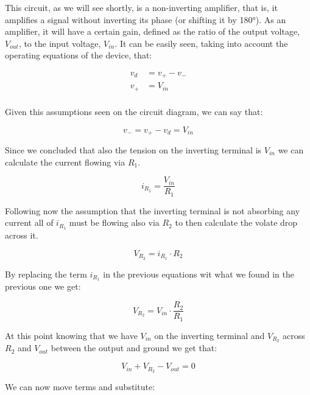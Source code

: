 \documentclass[../main.tex]{subfiles}
\begin{document}
This circuit, as we will see shortly, is a non-inverting amplifier, that is, it amplifies a signal without inverting its phase (or shifting it by 180°). 
As an amplifier, it will have a certain gain, defined as the ratio of the output voltage, $V_{out}$, to the input voltage, $V_{in}$. 
It can be easily seen, taking into account the operating equations of the
device, that:

\begin{equation}
\begin{aligned}
	v_d &= v_+ - v_-\\
	v_+ &= V_{in}\\
\end{aligned}
\end{equation}

Given this assumptions seen on the circuit diagram, we can say that:

\begin{equation}
	v_- = v_+ - v_d = V_{in}
\end{equation}

Since we concluded that also the tension on the inverting terminal is $V_{in}$ we can calculate the current flowing via $R_1$.

\begin{equation}
	i_{R_1} = \frac{V_{in}}{R_1}
\end{equation}

Following now the assumption that the inverting terminal is not absorbing any current all of $	i_{R_1}$ must be flowing also via $R_2$ to then calculate the volate drop across it.

\begin{equation}
	V_{R_2} = i_{R_1} \cdot R_2
\end{equation}

By replacing the term $i_{R_1}$ in the previous equations wit what we found in the previous one we get:

\begin{equation}
	V_{R_2} = V_{in} \cdot \frac{R_2}{R_1}
\end{equation} 

At this point knowing that we have $V_{in}$ on the inverting terminal and $V_{R_2}$ across $R_2$ and $V_{out}$ between the output and ground we get that:

\begin{equation}
	V_{in} + V_{R_2} - V_{out} = 0
\end{equation}

We can now move terms and substitute:
\end{document}
